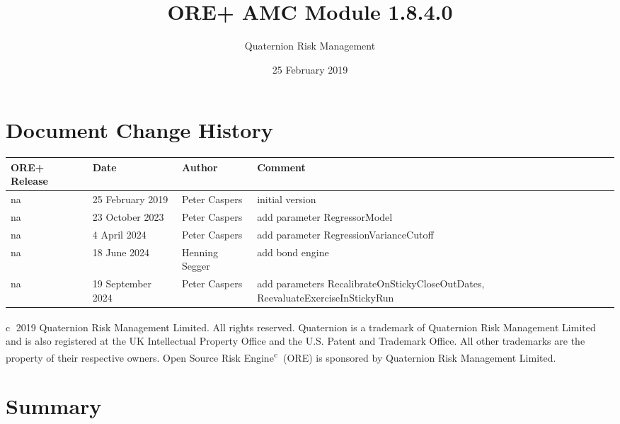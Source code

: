\documentclass[12pt, a4paper]{article}
\begin{document}
\title{ORE+ AMC Module 1.8.4.0}
\author{Quaternion Risk Management}
\date{25 February 2019}
\maketitle

\newpage

\section*{Document Change History}

\begin{center}
\begin{supertabular}{|l|l|l|p{7cm}|}
\hline
ORE+ Release & Date & Author & Comment \\
\hline
na & 25 February 2019  & Peter Caspers & initial version\\
na & 23 October 2023 & Peter Caspers & add parameter RegressorModel\\
na & 4 April 2024 & Peter Caspers & add parameter RegressionVarianceCutoff\\
na & 18 June 2024 & Henning Segger & add bond engine\\
na & 19 September 2024 & Peter Caspers & add parameters RecalibrateOnStickyCloseOutDates, ReevaluateExerciseInStickyRun\\
\hline
\end{supertabular}
\end{center}

\vspace{3cm}

\newpage

\tableofcontents
\vfill

\textcircled{c} 2019 Quaternion Risk Management Limited.  All rights reserved.
Quaternion\textsuperscript{\textregistered} is a trademark of Quaternion Risk Management Limited and is also registered
at the UK Intellectual Property Office and the U.S. Patent and Trademark Office.  All other trademarks are the property
of their respective owners. Open Source Risk Engine\textsuperscript{\textcircled{c}} (ORE) is sponsored by Quaternion
Risk Management Limited.

\newpage

\section{Summary}
\end{document}
